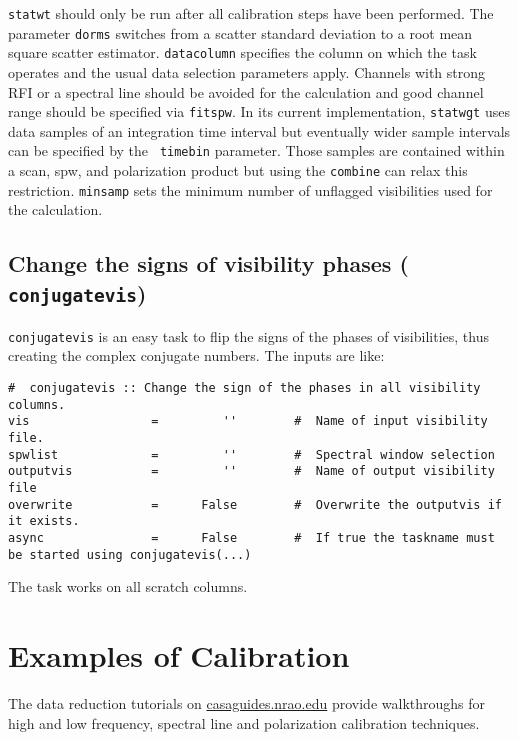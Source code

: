{\tt statwt} should only be run after all calibration steps have been
performed. The parameter {\tt dorms} switches from a scatter standard
deviation to a root mean square scatter estimator. {\tt datacolumn}
specifies the column on which the task operates and the usual data
selection parameters apply. Channels with strong RFI or a spectral
line should be avoided for the calculation and good channel range
should be specified via {\tt fitspw}. In its current implementation,
{\tt statwgt} uses data samples of an integration time interval but
eventually wider sample intervals can be specified by the {\tt
  timebin} parameter. Those samples are contained within a scan, spw,
and polarization product but using the {\tt combine} can relax this
restriction. {\tt minsamp} sets the minimum number of unflagged
visibilities used for the calculation.


\subsection{Change the signs of visibility phases ({\tt
    conjugatevis})}
\label{section:cal.other.conjugatevis}

{\tt conjugatevis} is an easy task to flip the signs of the phases of
visibilities, thus creating the complex conjugate numbers. The inputs
are like:

\small
\begin{verbatim} 
#  conjugatevis :: Change the sign of the phases in all visibility columns.
vis                 =         ''        #  Name of input visibility file.
spwlist             =         ''        #  Spectral window selection
outputvis           =         ''        #  Name of output visibility file
overwrite           =      False        #  Overwrite the outputvis if it exists.
async               =      False        #  If true the taskname must be started using conjugatevis(...)
\end{verbatim}
\normalsize

The task works on all scratch columns. 


\section{Examples of Calibration}
\label{section:cal.examples}

The data reduction tutorials on \url{casaguides.nrao.edu} provide
walkthroughs for
high and low frequency, spectral line and polarization calibration
techniques. 


